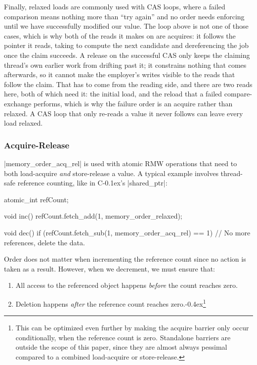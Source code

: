 \documentclass[fontsize=10pt, oneside]{scrartcl}
\newcommand{\punckern}{\kern-0.4ex}
\newcommand{\cplusplus}[1]{C\kern-0.1ex\raisebox{0.15ex}{\texttt{++}}}
\begin{document}
Finally, relaxed loads are commonly used with \textsc{CAS} loops,
where a failed comparison means nothing more than ``try again''
and no order needs enforcing until we have successfully modified our value.
The loop above is not one of those cases, which is why both of the reads it makes on  are acquires:
it follows the pointer it reads, taking  to compute the next candidate and dereferencing the job once the claim succeeds.
A release on the successful \textsc{CAS} only keeps the claiming thread's own earlier work from drifting past it;
it constrains nothing that comes afterwards,
so it cannot make the employer's writes visible to the reads that follow the claim.
That has to come from the reading side, and there are two reads here, both of which need it:
the initial load, and the reload that a failed compare-exchange performs, which is why the failure order is an acquire rather than relaxed.
A \textsc{CAS} loop that only re-reads a value it never follows can leave every load relaxed.

\subsubsection{Acquire-Release}

\cc|memory_order_acq_rel| is used with atomic \textsc{RMW} operations that need to both load-acquire \emph{and} store-release a value.
A typical example involves thread-safe reference counting,
like in \cplusplus{}'s \cpp|shared_ptr|:
\begin{cppcode}
atomic_int refCount;

void inc()
{
    refCount.fetch_add(1, memory_order_relaxed);
}
\end{cppcode}
\begin{cppcode}
void dec()
{
    if (refCount.fetch_sub(1, memory_order_acq_rel) == 1) {
        // No more references, delete the data.
    }
}
\end{cppcode}

Order does not matter when incrementing the reference count since no action is taken as a result.
However, when we decrement, we must ensure that:
\begin{enumerate}
  \item All access to the referenced object happens \emph{before} the count reaches zero.
  \item Deletion happens \emph{after} the reference count reaches zero.\punckern\footnote{%
        This can be optimized even further by making the acquire barrier only occur conditionally,
        when the reference count is zero.
        Standalone barriers are outside the scope of this paper,
        since they are almost always pessimal compared to a combined load-acquire or store-release.}
\end{enumerate}
\end{document}

